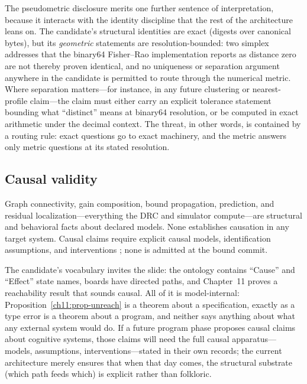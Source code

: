The pseudometric disclosure merits one further sentence of interpretation, because it interacts with the identity discipline that the rest of the architecture leans on. The candidate's structural identities are exact (digests over canonical bytes), but its \emph{geometric} statements are resolution-bounded: two simplex addresses that the binary64 Fisher--Rao implementation reports as distance zero are not thereby proven identical, and no uniqueness or separation argument anywhere in the candidate is permitted to route through the numerical metric. Where separation matters---for instance, in any future clustering or nearest-profile claim---the claim must either carry an explicit tolerance statement bounding what ``distinct'' means at binary64 resolution, or be computed in exact arithmetic under the decimal context. The threat, in other words, is contained by a routing rule: exact questions go to exact machinery, and the metric answers only metric questions at its stated resolution.

\subsection{Causal validity}\label{ch12:threats-causal}

\begin{threat}\label{ch12:threat-causal}
Graph connectivity, gain composition, bound propagation, prediction, and residual localization---everything the DRC and simulator compute---are structural and behavioral facts about declared models. None establishes causation in any target system. Causal claims require explicit causal models, identification assumptions, and interventions \cite{pearl}; none is admitted at the bound commit.
\end{threat}

The candidate's vocabulary invites the slide: the ontology contains ``Cause'' and ``Effect'' state names, boards have directed paths, and Chapter~11 proves a reachability result that sounds causal. All of it is model-internal: Proposition~\ref{ch11:prop-unreach} is a theorem about a specification, exactly as a type error is a theorem about a program, and neither says anything about what any external system would do. If a future program phase proposes causal claims about cognitive systems, those claims will need the full causal apparatus---models, assumptions, interventions---stated in their own records; the current architecture merely ensures that when that day comes, the structural substrate (which path feeds which) is explicit rather than folkloric.

